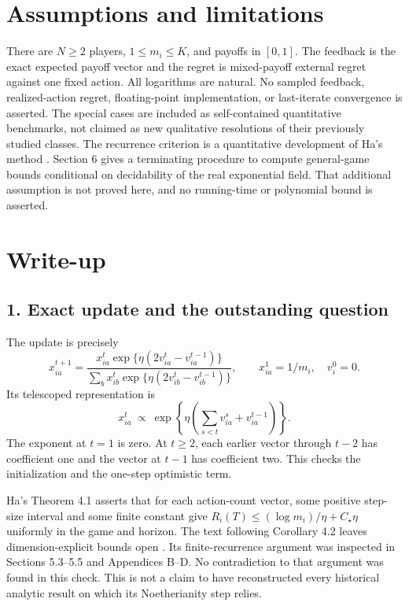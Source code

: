 \documentclass[11pt]{article}
\begin{document}
\section*{Assumptions and limitations}
There are $N\geq2$ players, $1\leq m_i\leq K$, and payoffs in $[0,1]$.
The feedback is the exact expected payoff vector and the regret is mixed-payoff
external regret against one fixed action. All logarithms are natural. No
sampled feedback, realized-action regret, floating-point implementation,
or last-iterate convergence is asserted. The special cases are included as
self-contained quantitative benchmarks, not claimed as new qualitative
resolutions of their previously studied classes. The recurrence criterion
is a quantitative development of Ha's method \cite{ha}. Section 6 gives
a terminating procedure to compute general-game bounds conditional on
decidability of the real exponential field. That additional assumption is
not proved here, and no running-time or polynomial bound is asserted.

\section*{Write-up}

\subsection*{1. Exact update and the outstanding question}
The update is precisely
\begin{equation}\label{eq:update}
 x_{ia}^{t+1}=\frac{x_{ia}^t\exp\{\eta(2v_{ia}^t-v_{ia}^{t-1})\}}
 {\sum_bx_{ib}^t\exp\{\eta(2v_{ib}^t-v_{ib}^{t-1})\}},
 \qquad x_{ia}^1=1/m_i,\quad v_i^0=0.
\end{equation}
Its telescoped representation is
\begin{equation}\label{eq:telescoped}
 x_{ia}^t\ \propto\
 \exp\!\left\{\eta\left(\sum_{s<t}v_{ia}^s+v_{ia}^{t-1}\right)\right\}.
\end{equation}
The exponent at $t=1$ is zero. At $t\geq2$, each earlier vector through
$t-2$ has coefficient one and the vector at $t-1$ has coefficient two.
This checks the initialization and the one-step optimistic term.

Ha's Theorem 4.1 asserts that for each action-count vector, some positive
step-size interval and some finite constant give
$R_i(T)\leq(\log m_i)/\eta+C_\star\eta$ uniformly in the game and horizon.
The text following Corollary 4.2 leaves dimension-explicit bounds open
\cite{ha}. Its finite-recurrence argument was inspected in Sections
5.3--5.5 and Appendices B--D. No contradiction to that argument was found
in this check. This is not a claim to have reconstructed every historical
analytic result on which its Noetherianity step relies.
\end{document}

